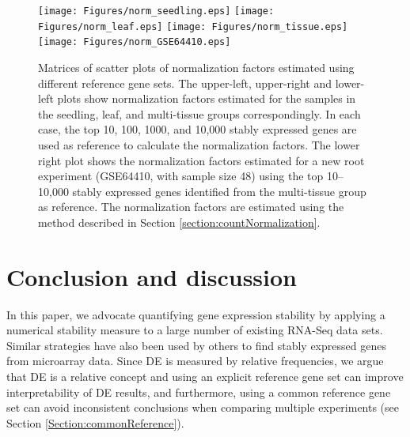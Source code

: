 \documentclass[fleqn,10pt,lineno]{wlpeerj} %
\begin{document}
			\begin{figure}[!ht]
				\begin{center}
					\texttt{[image: Figures/norm\_seedling.eps]}
					\texttt{[image: Figures/norm\_leaf.eps]}
					\texttt{[image: Figures/norm\_tissue.eps]}
					\texttt{[image: Figures/norm\_GSE64410.eps]}
					\caption[Matrices of scatter plots of normalization factors
					estimated using different reference gene sets]{Matrices of scatter plots of 
						normalization factors
						estimated using different reference gene sets. 
						The upper-left, upper-right and lower-left plots show
						normalization factors estimated for the samples in the
						seedling, leaf, and multi-tissue groups correspondingly. 
						In each case, the top 10, 100, 1000, and 10,000 stably
						expressed genes are used as reference to
						calculate the normalization factors.
						The lower right plot shows the normalization factors estimated for a new 
						root
						experiment (GSE64410, with sample size 48) using the top 10--10,000
						stably expressed genes identified from the multi-tissue group as
						reference. The normalization factors are estimated using the
						method described in Section \ref{section:countNormalization}.}
					\label{fig:normfactor} \end{center} \end{figure}
			
			\section{Conclusion and discussion}\label{section:discussion}
			
			In this paper, we advocate quantifying gene expression stability by applying a
			numerical stability measure to a large number of existing RNA-Seq data sets.
			Similar strategies have also been used by others to find stably expressed
			genes from microarray data. Since DE is measured by relative frequencies, we
			argue that DE is a relative concept and using an explicit reference gene set
			can improve interpretability of DE results, and furthermore,  using a common
			reference gene set can avoid inconsistent conclusions when comparing multiple
			experiments (see Section \ref{Section:commonReference}).
			
			
\end{document}
